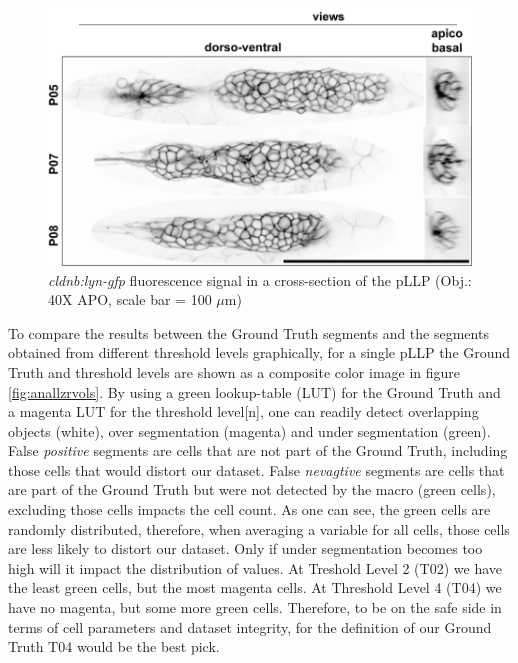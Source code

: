 \documentclass[11pt,singlespacinge,twoside]{reedthesis} %
\theoremstyle{definition}
\theoremstyle{definition}
\theoremstyle{definition}
\theoremstyle{remark}
\begin{document}
\begin{figure}

{\centering \includegraphics[width=0.7\linewidth]{figures/materials/ground_truth/stackmem} 

}

\caption[Image data pLLP segmentation]{\emph{cldnb:lyn-gfp} fluorescence signal in a cross-section of the pLLP (Obj.: 40X APO, scale bar = 100 \(\mu\)m)}\label{fig:stackmem}
\end{figure}
To compare the results between the Ground Truth segments and the segments obtained from different threshold levels graphically, for a single pLLP the Ground Truth and threshold levels are shown as a composite color image in figure \ref{fig:anallzrvols}. By using a green lookup-table (LUT) for the Ground Truth and a magenta LUT for the threshold level{[}n{]}, one can readily detect overlapping objects (white), over segmentation (magenta) and under segmentation (green). False \emph{positive} segments are cells that are not part of the Ground Truth, including those cells that would distort our dataset. False \emph{nevagtive} segments are cells that are part of the Ground Truth but were not detected by the macro (green cells), excluding those cells impacts the cell count. As one can see, the green cells are randomly distributed, therefore, when averaging a variable for all cells, those cells are less likely to distort our dataset. Only if under segmentation becomes too high will it impact the distribution of values. At Treshold Level 2 (T02) we have the least green cells, but the most magenta cells. At Threshold Level 4 (T04) we have no magenta, but some more green cells. Therefore, to be on the safe side in terms of cell parameters and dataset integrity, for the definition of our Ground Truth T04 would be the best pick.
\end{document}
